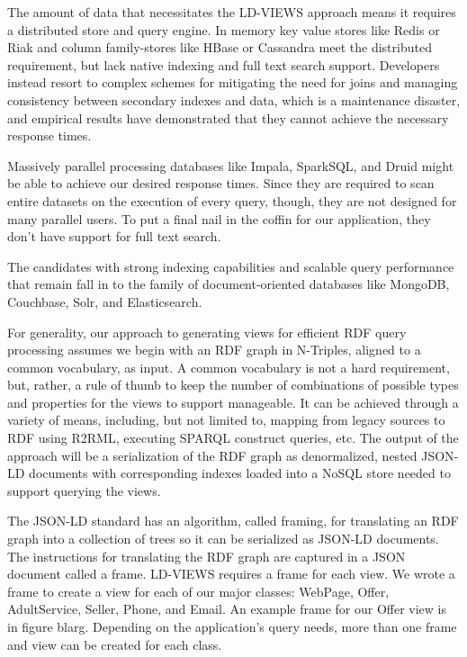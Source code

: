 The amount of data that necessitates the LD-VIEWS approach means it requires a distributed store and query engine.   In memory key value stores like Redis or Riak and column family-stores like HBase or Cassandra meet the distributed requirement, but lack native indexing and full text search support.  Developers instead resort to complex schemes for mitigating the need for joins and managing consistency between secondary indexes and data, which is a maintenance disaster, and empirical results have demonstrated that they cannot achieve the necessary response times.   

Massively parallel processing databases like Impala, SparkSQL, and Druid might be able to achieve our desired response times. Since they are required to scan entire datasets on the execution of every query, though, they are not designed for many parallel users.   To put a final nail in the coffin for our application, they don't have support for full text search.  

The candidates with strong indexing capabilities and scalable query performance that remain fall in to the family of document-oriented databases like MongoDB, Couchbase, Solr, and Elasticsearch.  



For generality, our approach to generating views for efficient RDF query processing assumes we begin with an RDF graph in N-Triples, aligned to a common vocabulary, as input.  
A common vocabulary is not a hard requirement, but, rather, a rule of thumb to keep the number of combinations of possible types and properties for the views to support manageable.
It can be achieved through a variety of means, including, but not limited to, mapping from legacy sources to RDF using R2RML, executing SPARQL construct queries, etc. 
The output of the approach will be a serialization of the RDF graph as denormalized, nested JSON-LD documents with corresponding indexes loaded into a NoSQL store needed to support querying the views. 

The JSON-LD standard has an algorithm, called framing, for translating an RDF graph into a collection of trees so it can be serialized as JSON-LD documents. %
The instructions for translating the RDF graph are captured in a JSON document called a frame.  
LD-VIEWS requires a frame for each view.  
We wrote a frame to create a view for each of our major classes: WebPage, Offer, AdultService, Seller, Phone, and Email.  
An example frame for our Offer view is in figure blarg.  
Depending on the application's query needs, more than one frame and view can be created for each class.  

